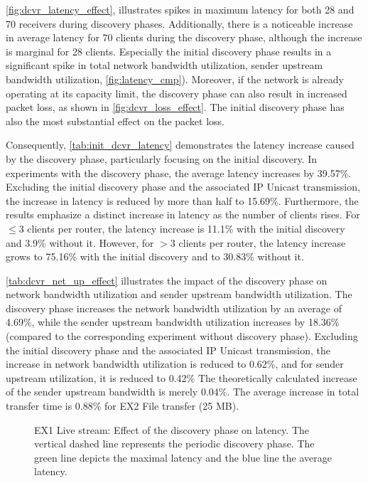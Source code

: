\autoref{fig:dcvr_latency_effect}, illustrates spikes in maximum latency for
    both 28 and 70 receivers during discovery phases.
Additionally, there is a noticeable increase in average latency for 70 clients
    during the discovery phase, although the increase is marginal for 28
    clients.
Especially the initial discovery phase results in a significant spike in
    total network bandwidth utilization, sender upstream bandwidth utilization,
    \autoref{fig:latency_cmp}).
Moreover, if the network is already operating at its capacity limit, the
    discovery phase can also result in increased packet loss, as shown in 
    \autoref{fig:dcvr_loss_effect}.
The initial discovery phase has also the most substantial effect on the packet
    loss.

Consequently, \autoref{tab:init_dcvr_latency} demonstrates the latency increase
    caused by the discovery phase, particularly focusing on the initial
    discovery.
In experiments with the discovery phase, the average latency increases by
    39.57\%.
Excluding the initial discovery phase and the associated IP Unicast
    transmission, the increase in latency is reduced by more than half to
    15.69\%.
Furthermore, the results emphasize a distinct increase in latency as the number
    of clients rises.
For $\leq 3$ clients per router, the latency increase is 11.1\% with the
    initial discovery and 3.9\% without it.
However, for $>3$ clients per router, the latency increase grows to 75.16\%
    with the initial discovery and to 30.83\% without it.

\autoref{tab:dcvr_net_up_effect} illustrates the impact of the discovery phase
    on network bandwidth utilization and sender upstream bandwidth utilization.
The discovery phase increases the network bandwidth utilization by an average
    of 4.69\%, while the sender upstream bandwidth utilization increases by
    18.36\% (compared to the corresponding experiment without discovery phase).
Excluding the initial discovery phase and the associated IP Unicast
    transmission, the increase in network bandwidth utilization is reduced to
    0.62\%, and for sender upstream utilization, it is reduced to 0.42\%
The theoretically calculated increase of the sender upstream bandwidth is
    merely 0.04\%.
The average increase in total transfer time is 0.88\% for EX2 File transfer
    (25 MB).

\begin{figure}
    \begin{center}
        
    \end{center}
    \caption[Effect of the discovery phase on latency]{
        EX1 Live stream: Effect of the discovery phase on latency.
        The vertical dashed line represents the periodic discovery phase.
        The green line depicts the maximal latency and the blue line the
        average latency.
    }
    \label{fig:dcvr_latency_effect}
\end{figure}

